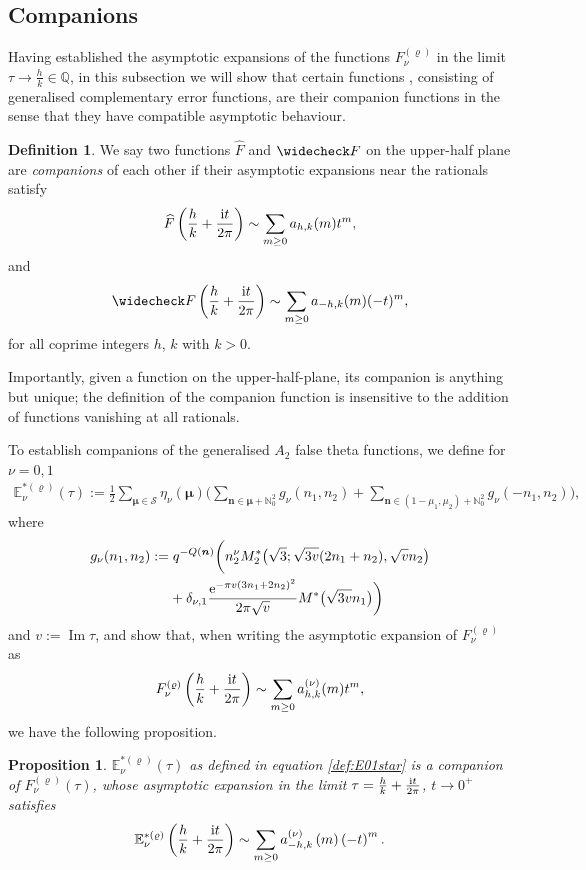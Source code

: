 \documentclass[pdftex]{sigma}
\def\BE{\mathbb{E}}
\def\CS{\mathcal{S}}
\newcommand{\QQ}{\mathbb{Q}}
\newcommand{\NN}{\mathbb{N}}
\def\bon{\mathbf{n}}
\def\bos{\varrho}
\def\bmu{\boldsymbol{\mu}}
\def\bon{\boldsymbol{n}}
\def\bosi{\bos}
\newtheorem{prop}[thm]{Proposition}
\theoremstyle{definition}
\newtheorem{defn}[thm]{Definition}
\numberwithin{equation}{section}
\begin{document}
\subsection{Companions}\label{subsec:companions}

Having established the asymptotic expansions of the functions $F_{\nu}^{( \bosi)}$ in the limit $\tau \to \frac{h}{k} \in \QQ$, in this subsection we will show that certain functions \smash{$\BE_\nu^{*(\bos)}(\tau)$}, consisting of generalised complementary error functions, are their companion functions in the sense that they have compatible asymptotic behaviour.

\begin{defn}\label{def:companions}
We say two functions $\widehat F$ and $\widecheck F$ on the upper-half plane are {\it companions} of each other if their asymptotic expansions near the rationals satisfy
\[
\widehat F\left(\frac{h}{k} +\frac{{\rm i}t}{2\pi}\right) \sim\sum_{m\geq 0} a_{h,k}(m) t^m,
\]
and
\[
\widecheck F\left(\frac{h}{k} +\frac{{\rm i}t}{2\pi}\right) \sim\sum_{m\geq 0} a_{-h,k}(m) (-t)^m,
\]
for all coprime integers $h$, $k$ with $k>0$.
\end{defn}
Importantly, given a function on the upper-half-plane, its companion is anything but unique; the definition of the companion function is insensitive to the addition of functions vanishing at all rationals.


To establish companions of the generalised $A_2$ false theta functions, we define for $\nu=0, 1$
\begin{gather}\label{def:E01star}
\BE_\nu^{*(\bos)}(\tau)
:= \frac{1}{2} \sum_{\bmu \in \CS}\eta_\nu(\bmu)\Biggl(\sum_{\bon \in \bmu + \NN_0^2} g_\nu(n_1,n_2)
+ \sum_{\bon \in (1-\mu_1,\mu_2) + \NN_0^2} g_\nu(-n_1,n_2) \Biggl),
\end{gather}
where
\begin{align}
 &g_\nu(n_1,n_2):= q^{-Q(\bon)} \bigg(n_2^\nu M_2^\ast \bigl( \sqrt{3} ; \sqrt{3v} (2n_1 + n_2), \sqrt{v}n_2\bigr)\nonumber\\
& \hphantom{g_\nu(n_1,n_2):=}{}
+ \delta_{\nu,1}\frac{ {\rm e}^{-\pi v (3n_1+2n_2)^2}}{2 \pi \sqrt{v}} M^\ast\bigl(\sqrt{3v} n_1\bigr) \bigg)\label{gnu}
\end{align}
and
$v:=\operatorname{Im}\tau$,
and show that, when writing the asymptotic expansion of $F_\nu^{(\bos)}$ as
\[
F_\nu^{(\bos)}\left(\frac{h}{k} +\frac{{\rm i}t}{2\pi}\right) \sim\sum_{m\geq 0} a_{h,k}^{(\nu)}(m) t^m,
\]
we have the following proposition.
\begin{prop}\label{prop:E01asymp}
	$\BE_{\nu}^{*(\bos)}\left( \tau \right)$ as defined in equation \eqref{def:E01star} is a companion of $F_\nu^{(\bosi)}(\tau)$, whose asymptotic expansion in the limit $\tau=\frac{h}{k}+\frac{{\rm i} t}{2\pi}$, $t\to 0^+$ satisfies
	\[
		\BE_{\nu}^{*(\bosi)}\left(\frac{h}{k}+\frac{{\rm i}t}{2\pi} \right)\sim
		\sum_{m\ge 0}a_{-h,k}^{(\nu)}\left( m \right)\left( -t \right)^{m}.
	\]
\end{prop}
\end{document}
